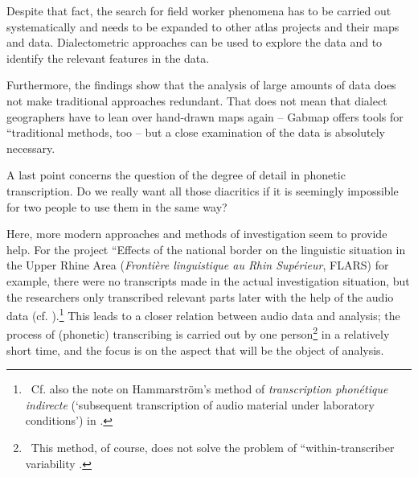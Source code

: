 \documentclass[output=paper]{LSP/langsci}
\begin{document}
Despite that fact, the search for field worker phenomena has to be carried out systematically and needs to be expanded to other atlas projects and their maps and data.  Dialectometric approaches can be used to explore the data and to identify the relevant features in the data.

Furthermore, the findings show that the analysis of large amounts of data does not make traditional approaches redundant. That does not mean that dialect geographers have to lean over hand-drawn maps again – Gabmap offers tools for ``traditional{\textquotedbl} methods, too – but a close examination of the data is absolutely necessary.

A last point concerns the question of the degree of detail in phonetic transcription. Do we really want all those diacritics if it is seemingly impossible for two people to use them in the same way?

Here, more modern approaches and methods of investigation seem to provide help. For the project ``Effects of the national border on the linguistic situation in the Upper Rhine Area{\textquotedbl} (\textit{Frontière linguistique au Rhin Supérieur}, FLARS) for example, there were no transcripts made in the actual investigation situation, but the researchers only transcribed relevant parts later with the help of the audio data (cf. \citealt{auer_auswirkungen_2015}).\footnote{\ Cf. also the note on Hammarström's method of \textit{transcription phonétique indirecte} (`subsequent transcription of audio material under laboratory conditions') in \citet[73]{hotzenkocherle_einfuhrung_1962}.} This leads to a closer relation between audio data and analysis; the process of (phonetic) transcribing is carried out by one person\footnote{\ This method, of course, does not solve the problem of ``within-transcriber variability{\textquotedbl} \citep[258]{kerswill_limits_1990}.} in a relatively short time, and the focus is on the aspect that will be the object of analysis.

\printbibliography[heading=subbibliography,notkeyword=this]
\end{document}
